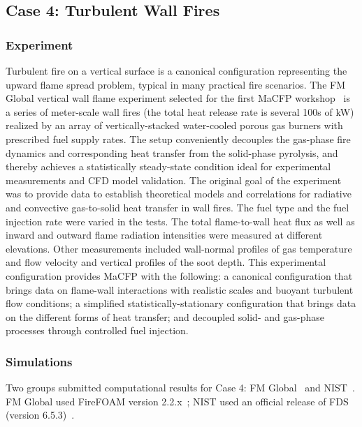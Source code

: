 
\subsection{Case 4: Turbulent Wall Fires} \label{sec:wall_fires}

\subsubsection{Experiment}

Turbulent fire on a vertical surface is a canonical configuration representing the upward flame spread problem, typical in many practical fire scenarios. The FM Global vertical wall flame experiment selected for the first MaCFP workshop~\cite{Case4_EXP_1,Case4_EXP_2} is a series of meter-scale wall fires (the total heat release rate is several 100s of kW) realized by an array of vertically-stacked water-cooled porous gas burners with prescribed fuel supply rates. The setup conveniently decouples the gas-phase fire dynamics and corresponding heat transfer from the solid-phase pyrolysis, and thereby achieves a statistically steady-state condition ideal for experimental measurements and CFD model validation. The original goal of the experiment was to provide data to establish theoretical models and correlations for radiative and convective gas-to-solid heat transfer in wall fires. The fuel type and the fuel injection rate were varied in the tests. The total flame-to-wall heat flux as well as inward and outward flame radiation intensities were measured at different elevations. Other measurements included wall-normal profiles of gas temperature and flow velocity and vertical profiles of the soot depth. This experimental configuration provides MaCFP with the following: a canonical configuration that brings data on flame-wall interactions with realistic scales and buoyant turbulent flow conditions; a simplified statistically-stationary configuration that brings data on the different forms of heat transfer; and decoupled solid- and gas-phase processes through controlled fuel injection.

\subsubsection{Simulations}

Two groups submitted computational results for Case 4: FM Global~\cite{Case4_SIM_FMG} and NIST~\cite{Case4_SIM_NIST}. FM Global used FireFOAM version 2.2.x~\cite{FireFOAM}; NIST used an official release of FDS (version 6.5.3)~\cite{FDS}.

